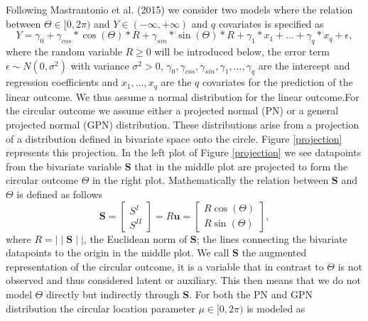 \documentclass[man]{apa6}
\theoremstyle{definition}
\theoremstyle{definition}
\theoremstyle{definition}
\theoremstyle{remark}
\begin{document}
Following Mastrantonio et al. (2015) we consider two models where the
relation between \(\Theta \in [0, 2\pi)\) and
\(Y\in (-\infty, + \infty)\) and \(q\) covariates is specified as
\begin{equation}\label{circlinlink}
Y = \gamma_0 + \gamma_{cos}*\cos(\Theta)*R + \gamma_{sin}*\sin(\Theta)*R + \gamma_1*x_1 + \dots + \gamma_q*x_q +  \epsilon,
\end{equation} \noindent where the random variable \(R\geq0\) will be
introduced below, the error term \(\epsilon \sim N(0, \sigma^2)\) with
variance \(\sigma^2>0\),
\(\gamma_0, \gamma_{cos}, \gamma_{sin}, \gamma_1, \dots, \gamma_q\) are
the intercept and regression coefficients and \(x_1, \dots, x_q\) are
the \(q\) covariates for the prediction of the linear outcome. We thus
assume a normal distribution for the linear outcome.\newline \indent For
the circular outcome we assume either a projected normal (PN) or a
general projected normal (GPN) distribution. These distributions arise
from a projection of a distribution defined in bivariate space onto the
circle. Figure \ref{projection} represents this projection. In the left
plot of Figure \ref{projection} we see datapoints from the bivariate
variable \(\boldsymbol{S}\) that in the middle plot are projected to
form the circular outcome \(\Theta\) in the right plot. Mathematically
the relation between \(\boldsymbol{S}\) and \(\Theta\) is defined as
follows \begin{equation}\label{projection}
\boldsymbol{S} = \begin{bmatrix} S^{I} \\ S^{II} \end{bmatrix} = R\boldsymbol{u} = \begin{bmatrix} R \cos (\Theta) \\  R\sin (\Theta) \end{bmatrix},
\end{equation} \noindent where \(R = \mid\mid \boldsymbol{S} \mid\mid\),
the Euclidean norm of \(\boldsymbol{S}\); the lines connecting the
bivariate datapoints to the origin in the middle plot. We call
\(\boldsymbol{S}\) the augmented representation of the circular outcome,
it is a variable that in contrast to \(\Theta\) is not observed and thus
considered latent or auxiliary. This then means that we do not model
\(\Theta\) directly but indirectly through \(\boldsymbol{S}\). \newline
\indent For both the PN and GPN distribution the circular location
parameter \(\mu\in [0, 2\pi)\) is modeled as
\end{document}
